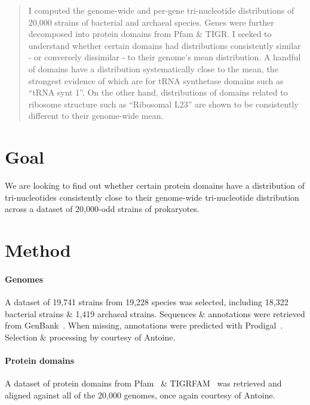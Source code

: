 \documentclass[12pt]{article}
\begin{document}
\maketitle

\begin{abstract}
I computed the genome-wide and per-gene tri-nucleotide distributions of 20,000 strains of bacterial and archaeal species. Genes were further decomposed into protein domains from Pfam \& TIGR. I seeked to understand whether certain domains had distributions consistently similar - or conversely dissimilar - to their genome's mean distribution. A handful of domains have a distribution systematically close to the mean, the strongest evidence of which are for tRNA synthetase domains such as ``tRNA synt 1''. On the other hand, distributions of domains related to ribosome structure such as ``Ribosomal L23'' are shown to be consistently different to their genome-wide mean.
\end{abstract}

\section{Goal}
We are looking to find out whether certain protein domains have a distribution of tri-nucleotides consistently close to their genome-wide tri-nucleotide distribution across a dataset of 20,000-odd strains of prokaryotes.

\section{Method}

\paragraph{Genomes}
A dataset of 19,741 strains from 19,228 species was selected, including 18,322 bacterial strains \& 1,419 archaeal strains. Sequences \& annotations were retrieved from GenBank~\cite{benson2012genbank}. When missing, annotations were predicted with Prodigal~\cite{hyatt2010prodigal}. Selection \& processing by courtesy of Antoine.

\paragraph{Protein domains}
A dataset of protein domains from Pfam~\cite{bateman2004pfam} \& TIGRFAM~\cite{haft2003tigrfams} was retrieved and aligned against all of the 20,000 genomes, once again courtesy of Antoine.
\end{document}
